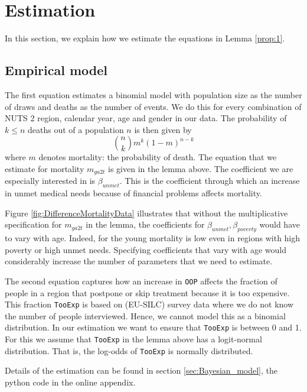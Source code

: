\documentclass[a4paper,12pt]{article}
\begin{document}
\section{Estimation}
\label{sec:orga6a31f6}
\label{sec:estimation}

In this section, we explain how we estimate the equations in Lemma \ref{prop:1}.

\subsection{Empirical model}
\label{sec:org5ef8c4b}

The first equation estimates a binomial model with population size as the number of draws and deaths as the number of events. We do this for every combination of NUTS 2 region, calendar year, age and gender in our data. The probability of \(k \leq n\) deaths out of a population \(n\) is then given by
\begin{equation}
\label{eq:binomial}
\binom{n}{k} m^{k}(1-m)^{n-k}
\end{equation}
where \(m\) denotes mortality: the probability of death. The equation that we estimate for mortality \(m_{ga2t}\) is given in the lemma above. The coefficient we are especially interested in is \(\beta_{unmet}\). This is the coefficient through which an increase in unmet medical needs because of financial problems affects mortality.

Figure \ref{fig:DifferenceMortalityData} illustrates that without the multiplicative specification for \(m_{ga2t}\) in the lemma, the coefficients for \(\beta_{unmet}, \beta_{poverty}\) would have to vary with age. Indeed, for the young mortality is low even in regions with high poverty or high unmet needs. Specifying coefficients that vary with age would considerably increase the number of parameters that we need to estimate. 

The second equation captures how an increase in \texttt{OOP} affects the fraction of people in a region that postpone or skip treatment because it is too expensive. This fraction \texttt{TooExp} is based on (EU-SILC) survey data where we do not know the number of people interviewed. Hence, we cannot model this as a binomial distribution. In our estimation we want to ensure that \texttt{TooExp} is between 0 and 1. For this we assume that \texttt{TooExp} in the lemma above has a logit-normal distribution. That is, the log-odds of \texttt{TooExp} is normally distributed.

Details of the estimation can be found in section \ref{sec:Bayesian_model}, the python code in the online appendix.
\end{document}
